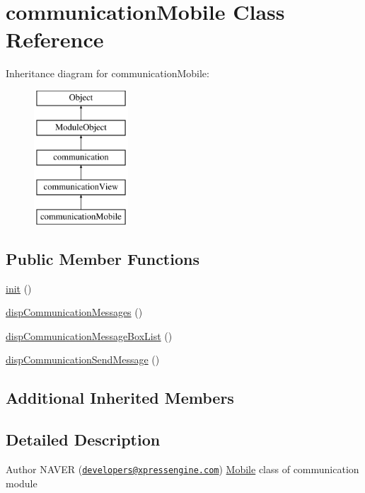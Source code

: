 \hypertarget{classcommunicationMobile}{\section{communication\-Mobile Class Reference}
\label{classcommunicationMobile}
}
Inheritance diagram for communication\-Mobile\-:\begin{figure}[H]
\begin{center}
\leavevmode
\includegraphics[height=5.000000cm]{classcommunicationMobile}
\end{center}
\end{figure}
\subsection*{Public Member Functions}
\begin{DoxyCompactItemize}
\item 
\hyperlink{classcommunicationMobile_a3fc9dd0a130e004c1fb5895ac6d4c920}{init} ()
\item 
\hyperlink{classcommunicationMobile_a1ff627f6e2111856cc297c2291dca2c7}{disp\-Communication\-Messages} ()
\item 
\hyperlink{classcommunicationMobile_a0f5fde87f62229177aa693fbc51c99d2}{disp\-Communication\-Message\-Box\-List} ()
\item 
\hyperlink{classcommunicationMobile_adb243fe0a373f12d98d472a895e41d7a}{disp\-Communication\-Send\-Message} ()
\end{DoxyCompactItemize}
\subsection*{Additional Inherited Members}


\subsection{Detailed Description}
\begin{DoxyAuthor}{Author}
N\-A\-V\-E\-R (\href{mailto:developers@xpressengine.com}{\tt developers@xpressengine.\-com}) \hyperlink{classMobile}{Mobile} class of communication module 
\end{DoxyAuthor}


